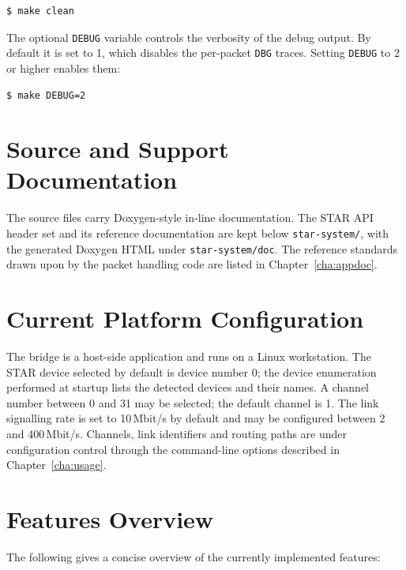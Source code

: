 \begin{lstlisting}[language=bash]
  $ make clean
\end{lstlisting}

\noindent
The optional \texttt{DEBUG} variable controls the verbosity of the debug
output. By default it is set to 1, which disables the per-packet \texttt{DBG}
traces. Setting \texttt{DEBUG} to 2 or higher enables them:

\begin{lstlisting}[language=bash]
  $ make DEBUG=2
\end{lstlisting}

\section{Source and Support Documentation}

The source files carry Doxygen-style in-line documentation. The \gls{STAR} API
header set and its reference documentation are kept below
\texttt{star-system/}, with the generated \gls{Doxygen} HTML under
\texttt{star-system/doc}. The reference standards drawn upon by the packet
handling code are listed in Chapter~\ref{cha:appdoc}.

\section{Current Platform Configuration}

The bridge is a host-side application and runs on a Linux workstation. The
\gls{STAR} device selected by default is device number 0; the device
enumeration performed at startup lists the detected devices and their names.
A channel number between 0 and 31 may be selected; the default channel is 1.
The link signalling rate is set to 10\,Mbit/s by default and may be configured
between 2 and 400\,Mbit/s. Channels, link identifiers and routing paths are
under configuration control through the command-line options described in
Chapter~\ref{cha:usage}.

\section{Features Overview}

The following gives a concise overview of the currently implemented features:

